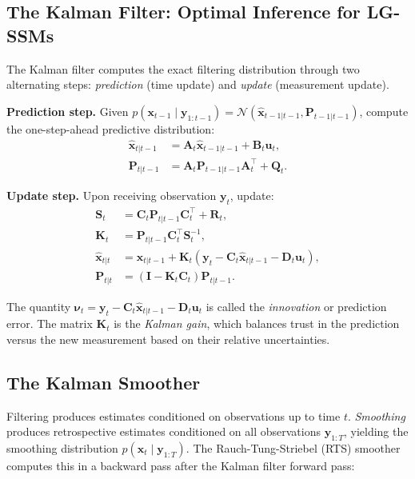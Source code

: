 \documentclass[conference]{IEEEtran}
\begin{document}
\subsection{The Kalman Filter: Optimal Inference for LG-SSMs}

The Kalman filter \cite{kalman1960new} computes the exact filtering distribution through two alternating steps: \emph{prediction} (time update) and \emph{update} (measurement update).

\textbf{Prediction step.} Given $p(\mathbf{x}_{t-1} \mid \mathbf{y}_{1:t-1}) = \mathcal{N}(\hat{\mathbf{x}}_{t-1|t-1}, \mathbf{P}_{t-1|t-1})$, compute the one-step-ahead predictive distribution:
\begin{align}
\hat{\mathbf{x}}_{t|t-1} &= \mathbf{A}_t \hat{\mathbf{x}}_{t-1|t-1} + \mathbf{B}_t \mathbf{u}_t, \label{eq:kf_pred_mean}\\
\mathbf{P}_{t|t-1} &= \mathbf{A}_t \mathbf{P}_{t-1|t-1} \mathbf{A}_t^\top + \mathbf{Q}_t. \label{eq:kf_pred_cov}
\end{align}

\textbf{Update step.} Upon receiving observation $\mathbf{y}_t$, update:
\begin{align}
\mathbf{S}_t &= \mathbf{C}_t \mathbf{P}_{t|t-1} \mathbf{C}_t^\top + \mathbf{R}_t, \label{eq:innovation_cov}\\
\mathbf{K}_t &= \mathbf{P}_{t|t-1} \mathbf{C}_t^\top \mathbf{S}_t^{-1}, \label{eq:kalman_gain}\\
\hat{\mathbf{x}}_{t|t} &= \hat{\mathbf{x}}_{t|t-1} + \mathbf{K}_t (\mathbf{y}_t - \mathbf{C}_t \hat{\mathbf{x}}_{t|t-1} - \mathbf{D}_t \mathbf{u}_t), \label{eq:kf_update_mean}\\
\mathbf{P}_{t|t} &= (\mathbf{I} - \mathbf{K}_t \mathbf{C}_t) \mathbf{P}_{t|t-1}. \label{eq:kf_update_cov}
\end{align}

The quantity $\boldsymbol{\nu}_t = \mathbf{y}_t - \mathbf{C}_t \hat{\mathbf{x}}_{t|t-1} - \mathbf{D}_t \mathbf{u}_t$ is called the \emph{innovation} or prediction error. The matrix $\mathbf{K}_t$ is the \emph{Kalman gain}, which balances trust in the prediction versus the new measurement based on their relative uncertainties.

\subsection{The Kalman Smoother}

Filtering produces estimates conditioned on observations up to time $t$. \emph{Smoothing} produces retrospective estimates conditioned on all observations $\mathbf{y}_{1:T}$, yielding the smoothing distribution $p(\mathbf{x}_t \mid \mathbf{y}_{1:T})$. The Rauch-Tung-Striebel (RTS) smoother \cite{rauch1965maximum} computes this in a backward pass after the Kalman filter forward pass:
\end{document}
